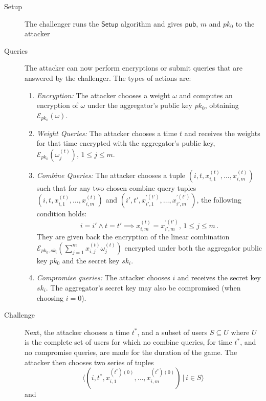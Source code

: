 \documentclass[twocolumn]{autart}
\theoremstyle{definition}
\theoremstyle{remark}
\begin{document}
\begin{description}
    \item[Setup] The challenger runs the $\mathsf{Setup}$ algorithm and gives $\mathsf{pub}$, $m$ and $pk_0$ to the attacker
    \item[Queries] The attacker can now perform encryptions or submit queries that are answered by the challenger. The types of actions are:
    \begin{enumerate}
        \item \textit{Encryption:} The attacker chooses a weight $\omega$ and computes an encryption of $\omega$ under the aggregator's public key $pk_0$, obtaining $\mathcal{E}_{pk_0}(\omega)$.
        \item \textit{Weight Queries:} The attacker chooses a time $t$ and receives the weights for that time encrypted with the aggregator's public key, $\mathcal{E}_{pk_0}(\omega^{(t)}_{j}),\,1\leq j\leq m$.
        \item \textit{Combine Queries:} The attacker chooses a tuple $(i,t,x^{(t)}_{i,1},\dots,x^{(t)}_{i,m})$ such that for any two chosen combine query tuples $(i,t,x^{(t)}_{i,1},\dots,x^{(t)}_{i,m})$ and $(i',t',x^{\prime(t')}_{i',1},\dots,x^{\prime(t')}_{i',m})$, the following condition holds:
        \begin{equation*}
            i = i' \wedge t = t' \implies x^{(t)}_{i,m} = x^{\prime(t')}_{i',m},\,1\leq j\leq m\,.
        \end{equation*}
        They are given back the encryption of the linear combination $\mathcal{E}_{pk_0,sk_i}(\sum^m_{j=1}x^{(t)}_{i,j}\omega^{(t)}_j)$ encrypted under both the aggregator public key $pk_0$ and the secret key $sk_i$.
        \item \textit{Compromise queries:} The attacker chooses $i$ and receives the secret key $sk_i$. The aggregator's secret key may also be compromised (when choosing $i=0$).
    \end{enumerate} 
    \item[Challenge] Next, the attacker chooses a time $t^*$, and a subset of users $S \subseteq U$ where $U$ is the complete set of users for which no combine queries, for time $t^*$, and no compromise queries, are made for the duration of the game. The attacker then chooses two series of tuples
    \begin{equation*}
        \langle(i,t^*,x^{(t^*)(0)}_{i,1},\dots,x^{(t^*)(0)}_{i,m})\,|\,i \in S\rangle
    \end{equation*}
    and
    \begin{equation*}

\end{equation*}
\end{description}
\end{document}
